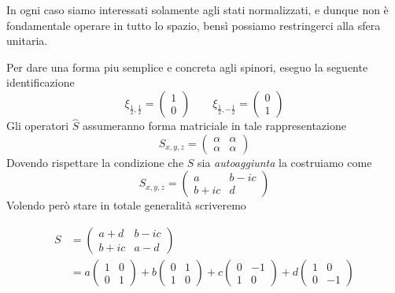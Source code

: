 In ogni caso siamo interessati solamente agli stati normalizzati, e
dunque non è fondamentale operare in tutto lo spazio, bensì possiamo
restringerci alla sfera unitaria.

Per dare una forma piu semplice e concreta agli spinori, eseguo la
seguente identificazione \[
	\xi_{\frac{1}{2}, \frac{1}{2}} =
	\begin{pmatrix}
		1 \\ 0
	\end{pmatrix} \qquad
	\xi_{\frac{1}{2}, - \frac{1}{2}} =
	\begin{pmatrix}
		0 \\ 1
	\end{pmatrix}
\] Gli operatori \(\hat{S}\) assumeranno forma matriciale in tale
rappresentazione \[
	S_{x,y,z} =
	\begin{pmatrix}
		\alpha & \alpha \\
		\alpha & \alpha
	\end{pmatrix}
\] Dovendo rispettare la condizione che \(S\) sia \emph{autoaggiunta} la
costruiamo come \[
	S_{x,y,z} =
	\begin{pmatrix}
		a      & b - ic \\
		b + ic & d
	\end{pmatrix}
\] Volendo però stare in totale generalità scriveremo

\begin{align*}
	S & =
	\begin{pmatrix}
		a + d & b-ic \\
		b+ic  & a-d
	\end{pmatrix} \\
	  & =
	a
	\begin{pmatrix}
		1 & 0 \\
		0 & 1
	\end{pmatrix}
	+ b \begin{pmatrix}
		    0 & 1 \\
		    1 & 0
	    \end{pmatrix}
	+ c \begin{pmatrix}
		    0 & -1 \\
		    1 & 0
	    \end{pmatrix}
	+d \begin{pmatrix}
		   1 & 0  \\
		   0 & -1
	   \end{pmatrix}
\end{align*}

